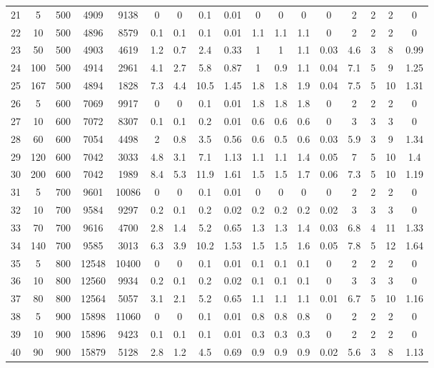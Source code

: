 \documentclass[11pt]{article}
\begin{document}
\begin{appendices}
\begin{landscape}
\begin{longtable}[c]{ccccc|cccc|cccc|cccc}
				\rowcolor[HTML]{EFEFEF} 
				21 & 5 & 500 & 4909 & 9138 & 0 & 0 & 0.1 & 0.01 & 0 & 0 & 0 & 0 & 2 & 2 & 2 & 0 \\
				\rowcolor[HTML]{EFEFEF} 
				22 & 10 & 500 & 4896 & 8579 & 0.1 & 0.1 & 0.1 & 0.01 & 1.1 & 1.1 & 1.1 & 0 & 2 & 2 & 2 & 0 \\
				\rowcolor[HTML]{EFEFEF} 
				23 & 50 & 500 & 4903 & 4619 & 1.2 & 0.7 & 2.4 & 0.33 & 1 & 1 & 1.1 & 0.03 & 4.6 & 3 & 8 & 0.99 \\
				\rowcolor[HTML]{EFEFEF} 
				24 & 100 & 500 & 4914 & 2961 & 4.1 & 2.7 & 5.8 & 0.87 & 1 & 0.9 & 1.1 & 0.04 & 7.1 & 5 & 9 & 1.25 \\
				\rowcolor[HTML]{EFEFEF} 
				25 & 167 & 500 & 4894 & 1828 & 7.3 & 4.4 & 10.5 & 1.45 & 1.8 & 1.8 & 1.9 & 0.04 & 7.5 & 5 & 10 & 1.31 \\
				26 & 5 & 600 & 7069 & 9917 & 0 & 0 & 0.1 & 0.01 & 1.8 & 1.8 & 1.8 & 0 & 2 & 2 & 2 & 0 \\
				27 & 10 & 600 & 7072 & 8307 & 0.1 & 0.1 & 0.2 & 0.01 & 0.6 & 0.6 & 0.6 & 0 & 3 & 3 & 3 & 0 \\
				28 & 60 & 600 & 7054 & 4498 & 2 & 0.8 & 3.5 & 0.56 & 0.6 & 0.5 & 0.6 & 0.03 & 5.9 & 3 & 9 & 1.34 \\
				29 & 120 & 600 & 7042 & 3033 & 4.8 & 3.1 & 7.1 & 1.13 & 1.1 & 1.1 & 1.4 & 0.05 & 7 & 5 & 10 & 1.4 \\
				30 & 200 & 600 & 7042 & 1989 & 8.4 & 5.3 & 11.9 & 1.61 & 1.5 & 1.5 & 1.7 & 0.06 & 7.3 & 5 & 10 & 1.19 \\
				\rowcolor[HTML]{EFEFEF} 
				31 & 5 & 700 & 9601 & 10086 & 0 & 0 & 0.1 & 0.01 & 0 & 0 & 0 & 0 & 2 & 2 & 2 & 0 \\
				\rowcolor[HTML]{EFEFEF} 
				32 & 10 & 700 & 9584 & 9297 & 0.2 & 0.1 & 0.2 & 0.02 & 0.2 & 0.2 & 0.2 & 0.02 & 3 & 3 & 3 & 0 \\
				\rowcolor[HTML]{EFEFEF} 
				33 & 70 & 700 & 9616 & 4700 & 2.8 & 1.4 & 5.2 & 0.65 & 1.3 & 1.3 & 1.4 & 0.03 & 6.8 & 4 & 11 & 1.33 \\
				\rowcolor[HTML]{EFEFEF} 
				34 & 140 & 700 & 9585 & 3013 & 6.3 & 3.9 & 10.2 & 1.53 & 1.5 & 1.5 & 1.6 & 0.05 & 7.8 & 5 & 12 & 1.64 \\
				35 & 5 & 800 & 12548 & 10400 & 0 & 0 & 0.1 & 0.01 & 0.1 & 0.1 & 0.1 & 0 & 2 & 2 & 2 & 0 \\
				36 & 10 & 800 & 12560 & 9934 & 0.2 & 0.1 & 0.2 & 0.02 & 0.1 & 0.1 & 0.1 & 0 & 3 & 3 & 3 & 0 \\
				37 & 80 & 800 & 12564 & 5057 & 3.1 & 2.1 & 5.2 & 0.65 & 1.1 & 1.1 & 1.1 & 0.01 & 6.7 & 5 & 10 & 1.16 \\
				\rowcolor[HTML]{EFEFEF} 
				38 & 5 & 900 & 15898 & 11060 & 0 & 0 & 0.1 & 0.01 & 0.8 & 0.8 & 0.8 & 0 & 2 & 2 & 2 & 0 \\
				\rowcolor[HTML]{EFEFEF} 
				39 & 10 & 900 & 15896 & 9423 & 0.1 & 0.1 & 0.1 & 0.01 & 0.3 & 0.3 & 0.3 & 0 & 2 & 2 & 2 & 0 \\
				\rowcolor[HTML]{EFEFEF} 
				40 & 90 & 900 & 15879 & 5128 & 2.8 & 1.2 & 4.5 & 0.69 & 0.9 & 0.9 & 0.9 & 0.02 & 5.6 & 3 & 8 & 1.13
			\end{longtable}
		\end{landscape}
		

\end{appendices}
\end{document}
